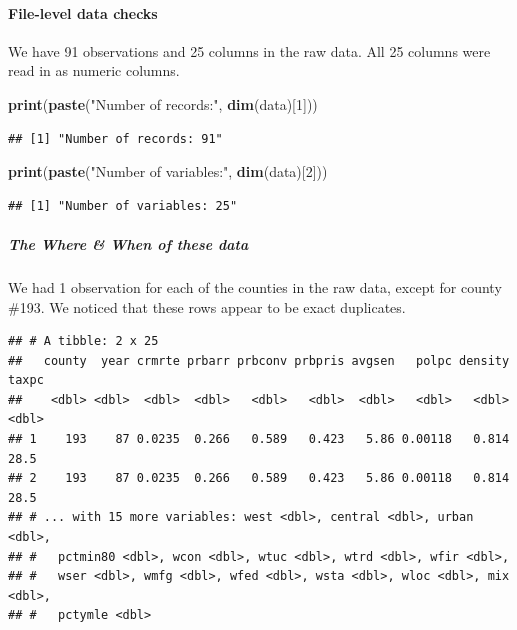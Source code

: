 \documentclass[]{article}
\newenvironment{Shaded}{\begin{snugshade}}{\end{snugshade}}
\newcommand{\DecValTok}[1]{\textcolor[rgb]{0.00,0.00,0.81}{#1}}
\newcommand{\KeywordTok}[1]{\textcolor[rgb]{0.13,0.29,0.53}{\textbf{#1}}}
\newcommand{\NormalTok}[1]{#1}
\newcommand{\OperatorTok}[1]{\textcolor[rgb]{0.81,0.36,0.00}{\textbf{#1}}}
\newcommand{\StringTok}[1]{\textcolor[rgb]{0.31,0.60,0.02}{#1}}
\let\oldparagraph\paragraph
\renewcommand{\paragraph}[1]{\oldparagraph{#1}\mbox{}}
\let\oldsubparagraph\subparagraph
\renewcommand{\subparagraph}[1]{\oldsubparagraph{#1}\mbox{}}
\begin{document}
\hypertarget{file-level-data-checks}{%
\paragraph{File-level data checks}\label{file-level-data-checks}}

We have 91 observations and 25 columns in the raw data. All 25 columns
were read in as numeric columns.

\begin{Shaded}
\begin{Highlighting}[]
\KeywordTok{print}\NormalTok{(}\KeywordTok{paste}\NormalTok{(}\StringTok{"Number of records:"}\NormalTok{, }\KeywordTok{dim}\NormalTok{(data)[}\DecValTok{1}\NormalTok{]))}
\end{Highlighting}
\end{Shaded}

\begin{verbatim}
## [1] "Number of records: 91"
\end{verbatim}

\begin{Shaded}
\begin{Highlighting}[]
\KeywordTok{print}\NormalTok{(}\KeywordTok{paste}\NormalTok{(}\StringTok{"Number of variables:"}\NormalTok{, }\KeywordTok{dim}\NormalTok{(data)[}\DecValTok{2}\NormalTok{]))}
\end{Highlighting}
\end{Shaded}

\begin{verbatim}
## [1] "Number of variables: 25"
\end{verbatim}

\hypertarget{the-where-when-of-these-data}{%
\subparagraph{The Where \& When of these
data}\label{the-where-when-of-these-data}}

We had 1 observation for each of the counties in the raw data, except
for county \#193. We noticed that these rows appear to be exact
duplicates.

\begin{Shaded}
\end{Shaded}

\begin{verbatim}
## # A tibble: 2 x 25
##   county  year crmrte prbarr prbconv prbpris avgsen   polpc density taxpc
##    <dbl> <dbl>  <dbl>  <dbl>   <dbl>   <dbl>  <dbl>   <dbl>   <dbl> <dbl>
## 1    193    87 0.0235  0.266   0.589   0.423   5.86 0.00118   0.814  28.5
## 2    193    87 0.0235  0.266   0.589   0.423   5.86 0.00118   0.814  28.5
## # ... with 15 more variables: west <dbl>, central <dbl>, urban <dbl>,
## #   pctmin80 <dbl>, wcon <dbl>, wtuc <dbl>, wtrd <dbl>, wfir <dbl>,
## #   wser <dbl>, wmfg <dbl>, wfed <dbl>, wsta <dbl>, wloc <dbl>, mix <dbl>,
## #   pctymle <dbl>
\end{verbatim}
\end{document}
